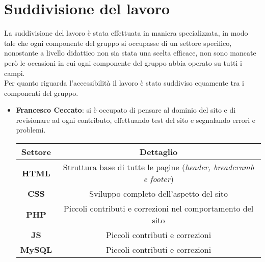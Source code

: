 \section{Suddivisione del lavoro}
\label{sec:organization}
La suddivisione del lavoro è stata effettuata in maniera specializzata, in modo tale che ogni componente del gruppo si occupasse di un settore specifico, nonostante a livello didattico non sia stata una scelta efficace, non sono mancate però le occasioni in cui ogni componente del gruppo abbia operato su tutti i campi. \\
Per quanto riguarda l'accessibilità il lavoro è stato suddiviso equamente tra i componenti del gruppo. 

\begin{itemize}
    \item \textbf{Francesco Ceccato}: si è occupato di pensare al dominio del sito e di revisionare ad ogni contributo, effettuando test del sito e segnalando errori e problemi.
    \begin{center}
        \begin{tabular}{| c | c |}
            \hline
            \textbf{Settore} & \textbf{Dettaglio}  \\ [0.5ex]
            \hline \hline
            \textbf{HTML} & Struttura base di tutte le pagine (\textit{header, breadcrumb e footer}) \\
            \hline
            \textbf{CSS} & Sviluppo completo dell'aspetto del sito \\
            \hline
            \textbf{PHP} & Piccoli contributi e correzioni nel comportamento del sito \\
            \hline
            \textbf{JS} & Piccoli contributi e correzioni \\
            \hline
            \textbf{MySQL} & Piccoli contributi e correzioni \\
            \hline
        \end{tabular}
    \end{center}


\end{itemize}
